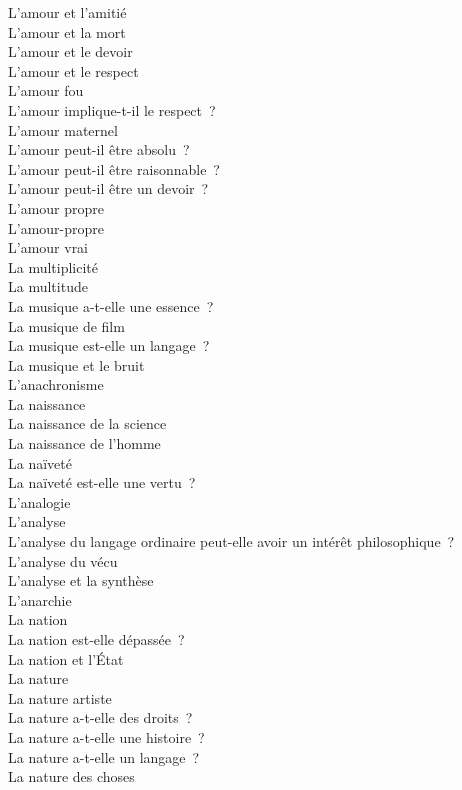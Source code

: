 \documentclass[a4paper,12pt]{article}
\begin{document}
L'amour et l'amitié \\
L'amour et la mort \\
L'amour et le devoir \\
L'amour et le respect \\
L'amour fou \\
L'amour implique-t-il le respect ? \\
L'amour maternel \\
L'amour peut-il être absolu ? \\
L'amour peut-il être raisonnable ? \\
L'amour peut-il être un devoir ? \\
L'amour propre \\
L'amour-propre \\
L'amour vrai \\
La multiplicité \\
La multitude \\
La musique a-t-elle une essence ? \\
La musique de film \\
La musique est-elle un langage ? \\
La musique et le bruit \\
L'anachronisme \\
La naissance \\
La naissance de la science \\
La naissance de l'homme \\
La naïveté \\
La naïveté est-elle une vertu ? \\
L'analogie \\
L'analyse \\
L'analyse du langage ordinaire peut-elle avoir un intérêt philosophique ? \\
L'analyse du vécu \\
L'analyse et la synthèse \\
L'anarchie \\
La nation \\
La nation est-elle dépassée ? \\
La nation et l'État \\
La nature \\
La nature artiste \\
La nature a-t-elle des droits ? \\
La nature a-t-elle une histoire ? \\
La nature a-t-elle un langage ? \\
La nature des choses \\
\end{document}
